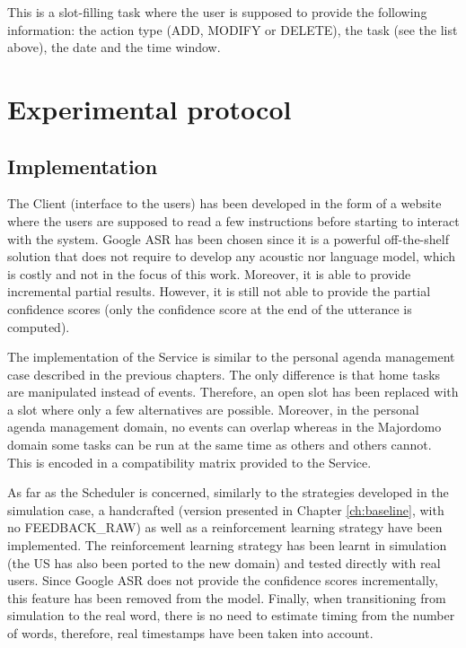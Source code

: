 	This is a slot-filling task where the user is supposed to provide the following information: the action type (ADD, MODIFY or DELETE), the task (see the list above), the date and the time window.

\section{Experimental protocol}

	\subsection{Implementation}
	
		The Client (interface to the users) has been developed in the form of a website where the users are supposed to read a few instructions before starting to interact with the system. Google ASR has been chosen since it is a powerful off-the-shelf solution that does not require to develop any acoustic nor language model, which is costly and not in the focus of this work. Moreover, it is able to provide incremental partial results. However, it is still not able to provide the partial confidence scores (only the confidence score at the end of the utterance is computed).
		
		The implementation of the Service is similar to the personal agenda management case described in the previous chapters. The only difference is that home tasks are manipulated instead of events. Therefore, an open slot has been replaced with a slot where only a few alternatives are possible. Moreover, in the personal agenda management domain, no events can overlap whereas in the Majordomo domain some tasks can be run at the same time as others and others cannot. This is encoded in a compatibility matrix provided to the Service.
		
		As far as the Scheduler is concerned, similarly to the strategies developed in the simulation case, a handcrafted (version presented in Chapter \ref{ch:baseline}, with no FEEDBACK\_RAW) as well as a reinforcement learning strategy have been implemented. The reinforcement learning strategy has been learnt in simulation (the US has also been ported to the new domain) and tested directly with real users. Since Google ASR does not provide the confidence scores incrementally, this feature has been removed from the model. Finally, when transitioning from simulation to the real word, there is no need to estimate timing from the number of words, therefore, real timestamps have been taken into account.
		
